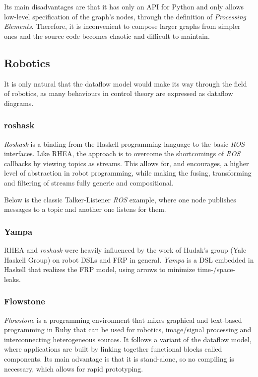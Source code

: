 \documentclass[sigplan,review,anonymous]{acmart}
\begin{document}
Its main disadvantages are that it has only an API for Python and only allows
low-level specification of the graph's nodes, through the definition of
\textit{Processing Elements}. Therefore, it is inconvenient to compose larger
graphs from simpler ones and the source code becomes chaotic and difficult to
maintain.

\subsection{Robotics}

It is only natural that the dataflow model would make its way through the field
of robotics, as many behaviours in control theory are expressed as dataflow
diagrams.

\subsubsection{roshask}

\textit{Roshask}\cite{roshask} is a binding from the Haskell programming language
to the basic \textit{ROS} interfaces. Like \textsc{RHEA}, the approach is to
overcome the shortcomings of \textit{ROS} callbacks by viewing topics as
streams. This allows for, and encourages, a higher level of abstraction in
robot programming, while making the fusing, transforming and filtering of
streams fully generic and compositional.

Below is the classic Talker-Listener \textit{ROS} example, where one node
publishes messages to a topic and another one listens for them.


\subsubsection{Yampa}

\textsc{RHEA} and \textit{roshask} were heavily influenced by the work of Hudak's
group (Yale Haskell Group) on robot DSLs and FRP in general\cite{fran,arrows_robots,lambda_in_motion,event_frp,real_frp,pushpull_frp}.
\textit{Yampa} is a DSL embedded in Haskell
that realizes the FRP model, using arrows to minimize time-/space- leaks.

\subsubsection{Flowstone}

\textit{Flowstone}  is a
programming environment that mixes graphical and text-based programming in Ruby
that can be used for robotics, image/signal processing and interconnecting
heterogeneous sources. It follows a variant of the dataflow model, where
applications are built by linking together functional blocks called components.
Its main advantage is that it is stand-alone, so no compiling is necessary,
which allows for rapid prototyping.
\end{document}
